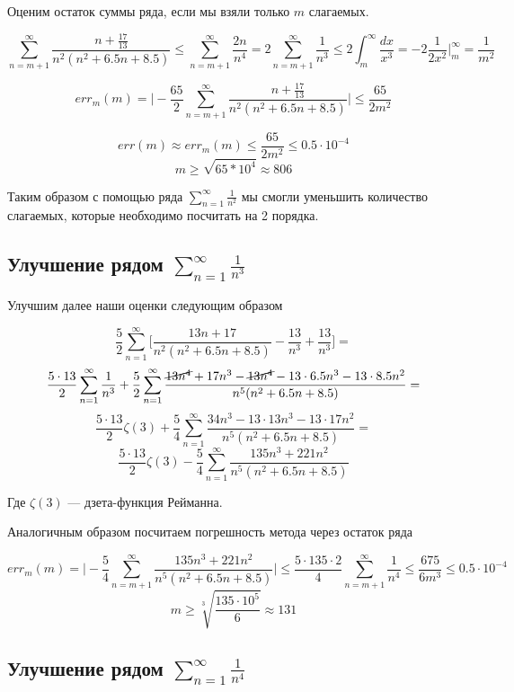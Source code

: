 \documentclass[11pt,a4paper,oneside]{article}
\begin{document}
Оценим остаток суммы ряда, если мы взяли только $m$ слагаемых.

$$ \sum_{n = m + 1}^{\infty} \frac{n + \frac{17}{13}}{n^2 (n^2 + 6.5n + 8.5)} \le
	\sum_{n = m + 1}^{\infty} \frac{2n}{n^4} = 
	2 \sum_{n = m + 1}^{\infty} \frac{1}{n^3} \le
	2 \int_{m}^{\infty} \frac{dx}{x^3} =
	-2 \frac{1}{2x^2}\biggr|_{m}^{\infty} =
	\frac{1}{m^2} $$
	
$$ err_{m}(m) =
	\biggr|-\frac{65}{2} \sum_{n = m + 1}^{\infty}
		\frac{n + \frac{17}{13}}{n^2 (n^2 + 6.5n + 8.5)}\biggr| \le
	\frac{65}{2m^2}$$
	
$$ err(m) \approx err_{m}(m) \le \frac{65}{2m^2} \le 0.5 \cdot 10^{-4} $$
$$ m \ge \sqrt{65 * 10^4} \approx 806 $$

Таким образом с помощью ряда $\sum_{n = 1}^{\infty} \frac{1}{n^2}$ мы смогли уменьшить количество слагаемых, которые необходимо посчитать на 2 порядка.
	
\subsection{Улучшение рядом $ \sum_{n = 1}^{\infty} \frac{1}{n^3} $}
	
Улучшим далее наши оценки следующим образом

$$ \frac{5}{2} \sum_{n = 1}^{\infty} \biggr[ \frac{13n + 17}{n^2 (n^2 + 6.5n + 8.5)} - 
	\frac{13}{n^3} + \frac{13}{n^3} \biggr] =$$
$$ \frac{5 \cdot 13}{2} \sum_{n = 1}^{\infty} \frac{1}{n^3} +
	\frac{5}{2} \sum_{n = 1}^{\infty}
	\frac{\cancel{13 n^4} + 17n^3 - \cancel{13 n^4} -
	13 \cdot 6.5 n^3 - 13 \cdot 8.5 n^2}{n^5 (n^2 + 6.5n + 8.5)} = $$
$$ \frac{5 \cdot 13}{2} \zeta(3) +
	\frac{5}{4} \sum_{n = 1}^{\infty}
	\frac{34 n^3 -
	13 \cdot 13 n^3 - 13 \cdot 17 n^2}{n^5 (n^2 + 6.5n + 8.5)} = $$
$$ \frac{5 \cdot 13}{2} \zeta(3) -
	\frac{5}{4} \sum_{n = 1}^{\infty}
	\frac{135 n^3 + 221 n^2}{n^5 (n^2 + 6.5n + 8.5)}$$
	
Где $\zeta(3)$ --- дзета-функция Рейманна.
	
Аналогичным образом посчитаем погрешность метода через остаток ряда

$$ err_{m}(m) = \biggr| - \frac{5}{4} \sum_{n = m + 1}^{\infty}
	\frac{135 n^3 + 221 n^2}{n^5 (n^2 + 6.5n + 8.5)} \biggr| \le
	\frac{5 \cdot 135 \cdot 2}{4} \sum_{n = m + 1}^{\infty} \frac{1}{n^4} \le
	\frac{675}{6 m^3} \le 0.5 \cdot 10^{-4} $$
$$ m \ge \sqrt[3]{\frac{135 \cdot 10^5}{6}} \approx 131 $$
		
\subsection{Улучшение рядом $ \sum_{n = 1}^{\infty} \frac{1}{n^4} $}
		
\end{document}

